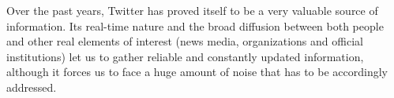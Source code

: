 Over the past years, Twitter has proved itself to be a very valuable source of information. Its real-time nature and the broad diffusion between both people and other real elements of interest (news media, organizations and official institutions) let us to gather reliable and constantly updated information, although it forces us to face a huge amount of noise that has to be accordingly addressed.

































